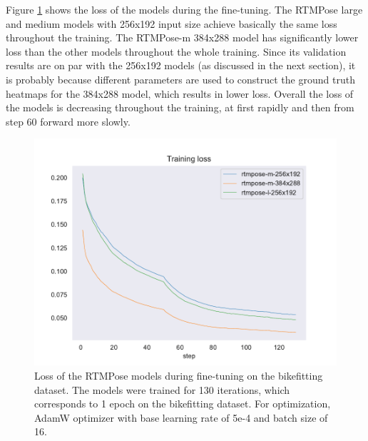 Figure \ref{fig:fine_tuning_loss} shows the loss of the models during the fine-tuning. The RTMPose large and medium models with 256x192 input size achieve basically the same loss throughout the training. The RTMPose-m 384x288 model has significantly lower loss than the other models throughout the whole training. Since its validation results are on par with the 256x192 models (as discussed in the next section), it is probably because different parameters are used to construct the ground truth heatmaps for the 384x288 model, which results in lower loss. Overall the loss of the models is decreasing throughout the training, at first rapidly and then from step 60 forward more slowly.
\begin{figure}[htb]

    \centering
    \includegraphics[width=1\linewidth]{obrazky-figures/loss.pdf}

    \caption{Loss of the RTMPose models during fine-tuning on the bikefitting dataset. The models were trained for 130 iterations, which corresponds to 1 epoch on the bikefitting dataset. For optimization, AdamW optimizer with base learning rate of 5e-4 and batch size of 16.}
    \label{fig:fine_tuning_loss}
\end{figure}


